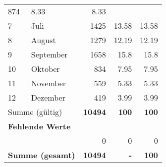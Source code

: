 \begin{longtable}{lXrrr}
       \num{874} &
       \num[round-mode=places,round-precision=2]{8.33} &
         \num[round-mode=places,round-precision=2]{8.33} \\

     7 &
     \multicolumn{1}{X}{ Juli   } &


       \num{1425} &
       \num[round-mode=places,round-precision=2]{13.58} &
         \num[round-mode=places,round-precision=2]{13.58} \\

     8 &
     \multicolumn{1}{X}{ August   } &


       \num{1279} &
       \num[round-mode=places,round-precision=2]{12.19} &
         \num[round-mode=places,round-precision=2]{12.19} \\

     9 &
     \multicolumn{1}{X}{ September   } &


       \num{1658} &
       \num[round-mode=places,round-precision=2]{15.8} &
         \num[round-mode=places,round-precision=2]{15.8} \\

     10 &
     \multicolumn{1}{X}{ Oktober   } &


       \num{834} &
       \num[round-mode=places,round-precision=2]{7.95} &
         \num[round-mode=places,round-precision=2]{7.95} \\

     11 &
     \multicolumn{1}{X}{ November   } &


       \num{559} &
       \num[round-mode=places,round-precision=2]{5.33} &
         \num[round-mode=places,round-precision=2]{5.33} \\

     12 &
     \multicolumn{1}{X}{ Dezember   } &


       \num{419} &
       \num[round-mode=places,round-precision=2]{3.99} &
         \num[round-mode=places,round-precision=2]{3.99} \\
     \midrule
     \multicolumn{2}{l}{Summe (gültig)} &
       \textbf{\num{10494}} &
     \textbf{\num{100}} &
       \textbf{\num[round-mode=places,round-precision=2]{100}} \\
     \multicolumn{5}{l}{\textbf{Fehlende Werte}}\\
      & & 0 & 0 & 0 \\
     \midrule
     \multicolumn{2}{l}{\textbf{Summe (gesamt)}} &
          \textbf{\num{10494}} &
        \textbf{-} &
        \textbf{\num{100}} \\
     \bottomrule
     \end{longtable}
     
